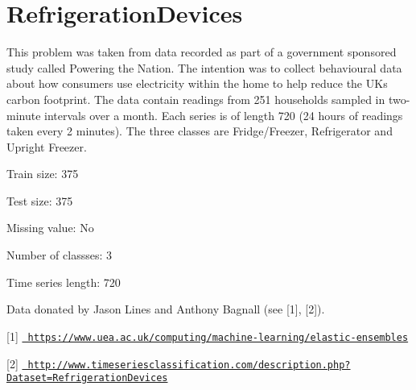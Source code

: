\chapter{Refrigeration\+Devices}
\hypertarget{md_external_2data_2UCRArchive__2018_2RefrigerationDevices_2README}{}\label{md_external_2data_2UCRArchive__2018_2RefrigerationDevices_2README}
\label{md_external_2data_2UCRArchive__2018_2RefrigerationDevices_2README_autotoc_md187}%
%
 This problem was taken from data recorded as part of a government sponsored study called Powering the Nation. The intention was to collect behavioural data about how consumers use electricity within the home to help reduce the UK\textquotesingle{}s carbon footprint. The data contain readings from 251 households sampled in two-\/minute intervals over a month. Each series is of length 720 (24 hours of readings taken every 2 minutes). The three classes are Fridge/\+Freezer, Refrigerator and Upright Freezer.

Train size\+: 375

Test size\+: 375

Missing value\+: No

Number of classses\+: 3

Time series length\+: 720

Data donated by Jason Lines and Anthony Bagnall (see \mbox{[}1\mbox{]}, \mbox{[}2\mbox{]}).

\mbox{[}1\mbox{]} \href{https://www.uea.ac.uk/computing/machine-learning/elastic-ensembles}{\texttt{ https\+://www.\+uea.\+ac.\+uk/computing/machine-\/learning/elastic-\/ensembles}}

\mbox{[}2\mbox{]} \href{http://www.timeseriesclassification.com/description.php?Dataset=RefrigerationDevices}{\texttt{ http\+://www.\+timeseriesclassification.\+com/description.\+php?\+Dataset=\+Refrigeration\+Devices}} 